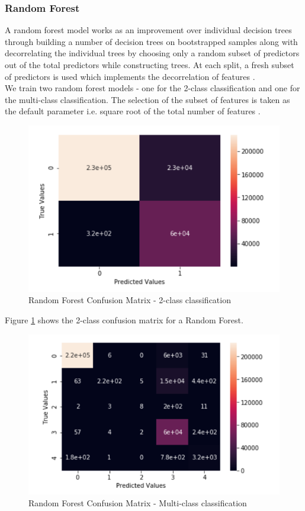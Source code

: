 \subsubsection{Random Forest}
A random forest model works as an improvement over individual decision trees through building a number of decision trees on bootstrapped samples along with decorrelating the individual trees by choosing only a random subset of predictors out of the total predictors while constructing trees. At each split, a fresh subset of predictors is used which implements the decorrelation of features \cite{islr09}.\\
We train two random forest models - one for the 2-class classification and one for the multi-class classification. The selection of the subset of features is taken as the default parameter i.e. square root of the total number of features \cite{scikit12}.
\begin{figure}
	\includegraphics[width=1.0\columnwidth]{images/rf2.PNG}
	\caption{Random Forest Confusion Matrix - 2-class classification}
	\label{F:rf2}
\end{figure}
Figure \ref{F:rf2} shows the 2-class confusion matrix for a Random Forest.
\begin{figure}
	\includegraphics[width=1.0\columnwidth]{images/rfall.PNG}
	\caption{Random Forest Confusion Matrix - Multi-class classification}
	\label{F:rfall}
\end{figure}
